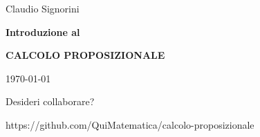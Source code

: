 \begin{titlepage}
    \begin{center}
        \vspace*{1cm}
        
        \LARGE
        Claudio Signorini

        \vspace{1.5cm}

        \Huge
        \textbf{Introduzione al}

        \textbf{CALCOLO PROPOSIZIONALE}

        \vspace{1.5cm}

        \LARGE
        \today

        \vfill

        \normalsize
        Desideri collaborare?

        https://github.com/QuiMatematica/calcolo-proposizionale
        
    \end{center}
\end{titlepage}
